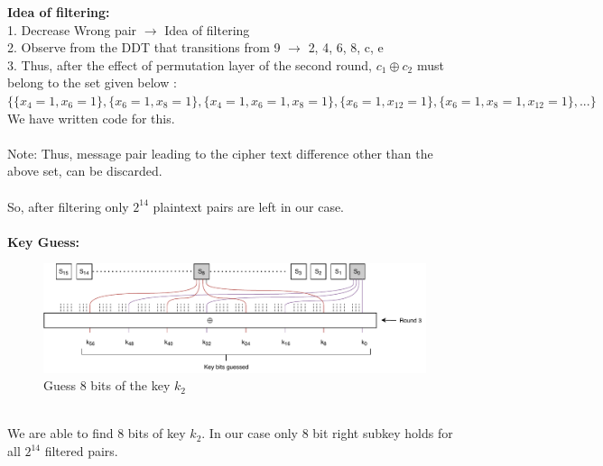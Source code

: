 \documentclass[journal=tosc,preprint]{iacrtrans}
\begin{document}
\textbf{Idea of filtering:}\\
1. Decrease Wrong pair $\rightarrow$ Idea of filtering\\
2. Observe from the DDT that transitions from
	9 $\rightarrow$ {2, 4, 6, 8, c, e}\\
3. Thus, after the effect of permutation layer of the second round, $c_1 \oplus c_2$ must belong to the set given below : \\ 
$\{\{x_4=1,x_6=1\},\{x_6=1,x_8=1\},\{x_4=1,x_6=1,x_8=1\},\{x_6=1,x_{12}=1\},\{x_6=1,x_8=1,x_{12}=1\},...\}$ We have written code for this.\\\\
Note: Thus, message pair leading to the cipher text difference other than the above set, can be discarded. \\\\
So, after filtering only $2^{14}$ plaintext pairs are left in our case.\\\\
\textbf{Key Guess:}\\
\begin{figure}[h!]
	\centering
	\includegraphics[width=0.9\linewidth, height=0.2\textheight]{DC2}
	\caption{Guess 8 bits of the key $k_2$}
	\label{fig:dc2}
\end{figure}\\
We are able to find 8 bits of key $k_2$. In our case only  8 bit right  subkey holds for all $2^{14}$ filtered pairs.
\end{document}
